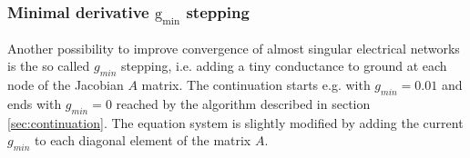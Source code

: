 \subsubsection{Minimal derivative $\mathrm{g_{min}}$ stepping}

Another possibility to improve convergence of almost singular
electrical networks is the so called $g_{min}$ stepping, i.e. adding a
tiny conductance to ground at each node of the Jacobian $A$ matrix.
The continuation starts e.g. with $g_{min} = 0.01$ and ends with
$g_{min} = 0$ reached by the algorithm described in section
\ref{sec:continuation}.  The equation system is slightly modified by
adding the current $g_{min}$ to each diagonal element of the matrix
$A$.
